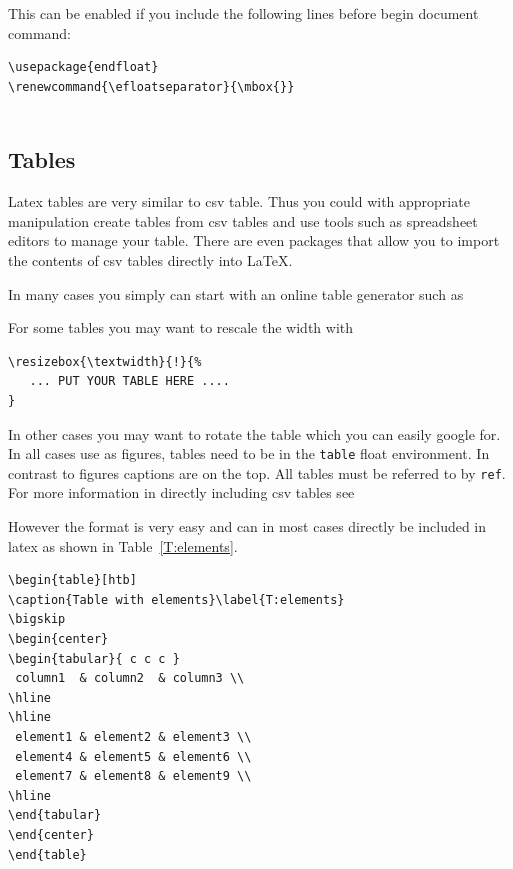 This can be enabled if you include the following lines before begin
document command:

\begin{verbatim}
\usepackage{endfloat}
\renewcommand{\efloatseparator}{\mbox{}} 


\end{verbatim}

\subsection{Tables}\label{tables}

Latex tables are very similar to csv table. Thus you could with
appropriate manipulation create tables from csv tables and use tools
such as spreadsheet editors to manage your table. There are even
packages that allow you to import the contents of csv tables directly
into \LaTeX.

In many cases you simply can start with an online table generator such as


For some tables you may want to rescale the width with

\begin{verbatim}
\resizebox{\textwidth}{!}{%
   ... PUT YOUR TABLE HERE ....
}
\end{verbatim}

In other cases you may want to rotate the table which you can easily
google for. In all cases use as figures, tables need to be in the
\verb|table| float environment. In contrast to figures captions are on
the top. All tables must be referred to by \verb|ref|. For more
information in directly including csv tables see 


However the format is very easy and can in most cases directly be
included in latex as shown in Table~\ref{T:elements}.

\begin{verbatim}
\begin{table}[htb]
\caption{Table with elements}\label{T:elements}
\bigskip
\begin{center}
\begin{tabular}{ c c c }
 column1  & column2  & column3 \\
\hline
\hline
 element1 & element2 & element3 \\ 
 element4 & element5 & element6 \\  
 element7 & element8 & element9 \\
\hline
\end{tabular}
\end{center}
\end{table}
\end{verbatim}

